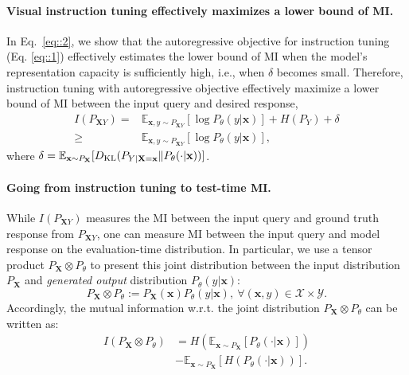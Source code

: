 \paragraph{Visual instruction tuning effectively maximizes a lower bound of MI.} 
In Eq.~\eqref{eq::2}, we show that the autoregressive objective for instruction tuning (Eq. \eqref{eq::1}) effectively estimates the lower bound of MI when the model's representation capacity is sufficiently high, i.e., when $\delta$ becomes small. Therefore, instruction tuning with autoregressive objective effectively maximize a lower bound of MI between the input query and desired response,
\begin{align}\label{eq::2}
    I(P_{\mathbf{X}Y}) = & \mathbb{E}_{\mathbf{x},y \sim P_{\mathbf{X}Y}} [\log P_{{\theta}}(y|\mathbf{x})]+H(P_Y) + \delta  \nonumber \\
    \geq & \mathbb{E}_{\mathbf{x},y \sim P_{\mathbf{X}Y}} [\log P_{{\theta}}(y|\mathbf{x})],
\end{align}
where 
$
\delta= \mathbb{E}_{\mathbf{x}\sim P_{\mathbf{X}}} [D_{\rm KL}(P_{Y|\mathbf{X}=\mathbf{x}}\| P_{\theta}(\cdot|\mathbf{x}))] 
$. 

\paragraph{Going from instruction tuning to test-time MI.} While $I(P_{\mathbf{X}Y})$ measures the MI between the input query and ground truth response from $P_{\mathbf{X}Y}$, one can measure MI between the input query and model response on the evaluation-time distribution. In particular, we use a tensor product $P_{\mathbf{X}} \otimes P_{\theta}$ to present this joint distribution between the input distribution $P_\mathbf{X}$ and \emph{generated output} distribution $P_{\theta}(y|\mathbf{x})$:
\begin{equation}
    P_{\mathbf{X}} \otimes P_{\theta} :=P_{\mathbf{X}}(\mathbf{x}) P_{\theta}(y|\mathbf{x}),~\forall (\mathbf{x},y)\in \mathcal{X}\times \mathcal{Y}.%
\end{equation}
Accordingly, the mutual information w.r.t. the joint distribution $P_{\mathbf{X}} \otimes P_{\theta}$ can be written as:
\begin{equation}
\begin{split}
   I(P_{\mathbf X}\otimes P_{\theta})& = H(\mathbb{E}_{\mathbf{x}\sim P_{\mathbf{X}}}[P_{\theta}(\cdot|\mathbf{x})])\\ &-\mathbb{E}_{\mathbf{x}\sim P_{\mathbf{X}}} [H(P_{\theta}(\cdot|\mathbf{x}))].
    \end{split}
    \label{eq:mi_generation}
\end{equation}
